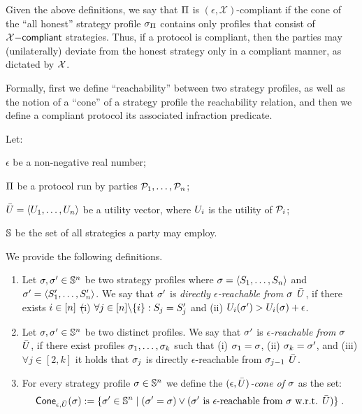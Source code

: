 Given the above definitions, we say that $\Pi$ is
$(\epsilon,\mathcal{X})$-compliant if the cone of the ``all honest'' strategy
profile $\sigma_\Pi$ contains only profiles that consist of $\mathcal{X}\mathsf{-compliant}$
strategies. Thus, if a protocol is compliant, then the parties may
(unilaterally) deviate from the honest strategy only in a compliant manner, as
dictated by $\mathcal{X}$.

Formally, first we define ``reachability'' between two strategy profiles, as
well as the notion of a ``cone'' of a strategy profile \wrt the reachability
relation, and then we define a compliant protocol \wrt its associated
infraction predicate.

\begin{definition}\label{def:reach}
    Let:
    \begin{inparaenum}[i)]
        \item $\epsilon$ be a non-negative real number;
        \item $\Pi$ be a protocol run by parties $\mathcal{P}_1, \ldots, \mathcal{P}_n$;
        \item $\bar{U}=\langle U_1, \ldots, U_n \rangle$ be a utility vector, where $U_i$ is the utility of $\mathcal{P}_i$;
        \item $\mathbb{S}$ be the set of all strategies a party may employ.
    \end{inparaenum}
    We provide the following definitions.
    \begin{enumerate}
        \item Let $\sigma, \sigma' \in \mathbb{S}^n$ be two strategy profiles where $\sigma = \langle S_1, \ldots, S_n \rangle$ and $\sigma'= \langle S'_1, \ldots, S'_n \rangle$. We say that $\sigma'$ is \emph{directly $\epsilon$-reachable from $\sigma$ \wrt $\bar{U}$}, if there exists $i \in [n]$ \st (i) $\forall j \in [n] \backslash \{i\}: S_j = S'_j$ and (ii) $U_i(\sigma') > U_i(\sigma) + \epsilon$.
        \item Let $\sigma, \sigma' \in \mathbb{S}^n$ be two distinct profiles. We say that $\sigma'$ is \emph{$\epsilon$-reachable from $\sigma$ \wrt $\bar{U}$}, if there exist profiles $\sigma_1, \ldots, \sigma_k$ such that (i) $\sigma_1 = \sigma$, (ii) $\sigma_k = \sigma'$, and (iii) $\forall j \in [2, k]$ it holds that $\sigma_j$ is directly $\epsilon$-reachable from $\sigma_{j-1}$ \wrt $\bar{U}$.
        \item For every strategy profile $\sigma \in \mathbb{S}^n$ we define the \emph{$(\epsilon, \bar{U})$-cone of $\sigma$} as the set:
        \[\mathsf{Cone}_{\epsilon, \bar{U}}(\sigma) := \{\sigma' \in \mathbb{S}^n\;|\;(\sigma' = \sigma) \lor (\sigma'\mbox{ is $\epsilon$-reachable from }\sigma\mbox{ w.r.t. }\bar{U})\}\;.\]
    \end{enumerate}
\end{definition}


